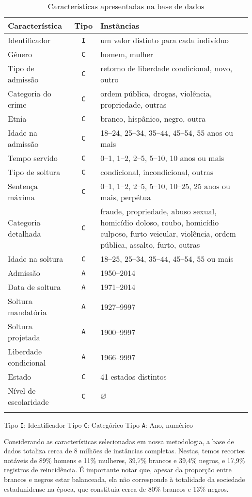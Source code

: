 \documentclass[12pt]{article}
\begin{document}
\begin{table}[h]
\begin{threeparttable}
\caption{Características apresentadas na base de dados}
\label{tab:features}
\begin{tabularx}{\linewidth}{lcX}
Característica & Tipo & Instâncias\\
\hline
Identificador & \texttt{I} & um valor distinto para cada indivíduo\\
\arrayrulecolor{lightgray}\hline
Gênero & \texttt{C} & homem, mulher\\
Tipo de admissão & \texttt{C} & retorno de liberdade condicional, novo, outro\\
Categoria do crime & \texttt{C} & ordem pública, drogas, violência, propriedade, outras\\
Etnia & \texttt{C} & branco, hispânico, negro, outra\\
Idade na admissão & \texttt{C} & 18--24, 25--34, 35--44, 45--54, 55 anos ou mais\\
Tempo servido & \texttt{C} & 0--1, 1--2, 2--5, 5--10, 10 anos ou mais\\
Tipo de soltura & \texttt{C} & condicional, incondicional, outras\\
Sentença máxima & \texttt{C} & 0--1, 1--2, 2--5, 5--10, 10--25, 25 anos ou mais, perpétua\\
\arrayrulecolor{lightgray}\hline
Categoria detalhada & \texttt{C} & fraude, propriedade, abuso sexual, homicídio doloso, roubo,  homicídio culposo, furto veicular, violência, ordem pública, assalto, furto, outras\\
Idade na soltura & \texttt{C} & 18--25, 25--34, 35--44, 45--54, 55 ou mais\\
\arrayrulecolor{lightgray}\hline
Admissão & \texttt{A} & 1950--2014\\
Data de soltura & \texttt{A} & 1971--2014\\
Soltura mandatória & \texttt{A} & 1927--9997 \footnotemark[1] \\
Soltura projetada & \texttt{A} & 1900--9997 \footnotemark[1] \\
Liberdade condicional\footnotemark[3] & \texttt{A} & 1966--9997 \footnotemark[1]\\
Estado & \texttt{C} & 41 estados distintos\\
\arrayrulecolor{lightgray}\hline
Nível de escolaridade & \texttt{C} & $\varnothing$ \footnotemark[2] \\
\arrayrulecolor{lightgray}\hline
\end{tabularx}
\kern 4pt \hskip 1pt Tipo \texttt{I}: Identificador \hfill Tipo \texttt{C}: Categórico \hfill Tipo \texttt{A}: Ano, numérico
\end{threeparttable}
\end{table}
Considerando as características selecionadas em nossa metodologia, a base de dados totaliza cerca de 8 milhões de instâncias completas. Nestas, temos recortes notáveis de 89\% homens e 11\% mulheres, 39,7\% brancos e 39,4\% negros, e 17,9\% registros de reincidência. É importante notar que, apesar da proporção entre brancos e negros estar balanceada, ela não corresponde à totalidade da sociedade estadunidense na época, que constituia cerca de 80\% brancos e 13\% negros. \cite{census}
\end{document}
